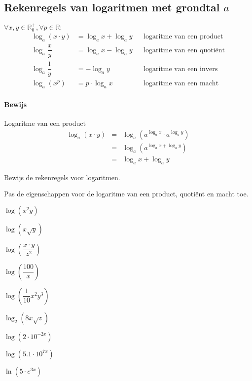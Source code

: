 \documentclass[12pt,twoside,a4paper]{article}
\begin{document}
\subsection{Rekenregels van logaritmen met grondtal $a$}

\begin{mdframed}
$\forall x,y \in \mathbb{R}_0^+, \forall p\in \mathbb{R}:$
\begin{align*}
\log_a(x\cdot y) &= \log_a x + \log_a y && \mbox{logaritme van een product}\\
\log_a \dfrac{x}{y} &= \log_a x - \log_a y && \mbox{logaritme van een quotiënt}\\
\log_a \dfrac{1}{y} &= - \log_a y && \mbox{logaritme van een invers}\\
\log_a(x^p) &= p\cdot\log_a x && \mbox{logaritme van een macht}
\end{align*}
\end{mdframed}

\paragraph{Bewijs} Logaritme van een product
\begin{eqnarray*}
  \log_a(x\cdot y) &=& \log_a\left(a^{\log_a x}\cdot a^{\log_a y}\right)\\
                   &=& \log_a\left(a^{\log_a x + \log_a y}\right)\\
                   &=& \log_a x + \log_a y
\end{eqnarray*}

\begin{oefening}
Bewijs de rekenregels voor logaritmen.
\end{oefening}

\begin{oefening} %
Pas de eigenschappen voor de logaritme van een product, quotiënt en macht toe.
\begin{exlist}{2}
  \item $\log \left(x^2y\right)$
  \item $\log \left(x\sqrt{y}\right)$
  \item $\log \left(\dfrac{x\cdot y}{z^2}\right)$
  \item $\log \left(\dfrac{100}{x}\right)$
  \item $\log \left(\dfrac{1}{10}x^2y^3\right)$
  \item $\log_2 \left(8x\sqrt{z}\right)$
  \item $\log \left(2\cdot 10^{-2x}\right)$
  \item $\log \left(5.1\cdot 10^{7x}\right)$
  \item $\ln \left(5\cdot e^{3x}\right)$
\end{exlist}
\end{oefening}
\end{document}
